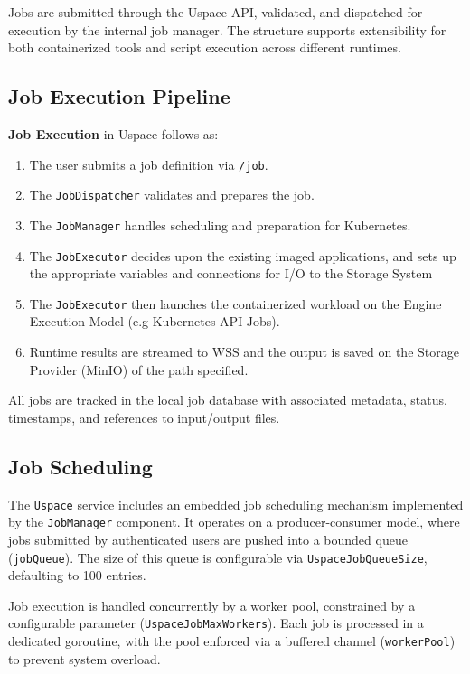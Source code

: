 Jobs are submitted through the Uspace API, validated, and dispatched for execution by the internal job manager. The structure supports extensibility for both containerized tools and script execution across different runtimes.

\subsection{Job Execution Pipeline}
\textbf{Job Execution} in Uspace follows as:
\begin{enumerate}
  \item The user submits a job definition via \texttt{/job}.
  \item The \texttt{JobDispatcher} validates and prepares the job.
  \item The \texttt{JobManager} handles scheduling and preparation for Kubernetes.
  \item The \texttt{JobExecutor} decides upon the existing imaged applications, and sets up the appropriate variables and connections for I/O to the Storage System
  \item The \texttt{JobExecutor} then launches the containerized workload on the Engine Execution Model (e.g Kubernetes API Jobs).
  \item Runtime results are streamed to WSS and the output is saved on the Storage Provider (MinIO) of the path specified.
\end{enumerate}

All jobs are tracked in the local job database with associated metadata, status, timestamps, and references to input/output files.

\subsection{Job Scheduling}

The \texttt{Uspace} service includes an embedded job scheduling mechanism implemented by the \texttt{JobManager} component. It operates on a producer-consumer model, where jobs submitted by authenticated users are pushed into a bounded queue (\texttt{jobQueue}). The size of this queue is configurable via \texttt{UspaceJobQueueSize}, defaulting to 100 entries.

Job execution is handled concurrently by a worker pool, constrained by a configurable parameter (\texttt{UspaceJobMaxWorkers}). Each job is processed in a dedicated goroutine, with the pool enforced via a buffered channel (\texttt{workerPool}) to prevent system overload.

